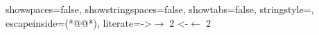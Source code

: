 {  showspaces=false,                %
  showstringspaces=false,          %
  showtabs=false,                  %
  stringstyle=\color{mymauve},     %
 escapeinside={(*@}{@*)},
 literate={->}{$\rightarrow\;$}{2}
          {<-}{$\leftarrow\;$}{2}
}

\usepackage[export]{adjustbox}
\usepackage{textcomp}
\usepackage{xcolor}
\usepackage{proof}
\usepackage{stmaryrd}
\usepackage{todonotes}
\usepackage{tikz}
\usepackage{tikz-cd}
\usepackage{cleveref}
\usepackage[caption=false]{subfig}
\DeclareMathOperator*{\colim}{colim}

